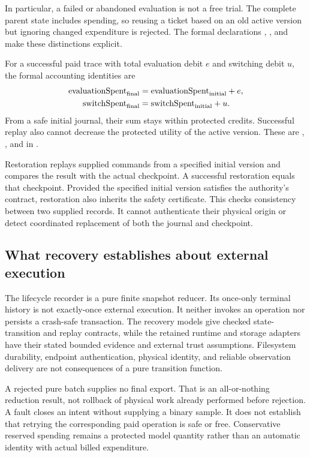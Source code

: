 In particular, a failed or abandoned evaluation is not a free trial. The
complete parent state includes spending, so reusing a ticket based on an old
active version but ignoring changed expenditure is rejected. The formal
declarations ,
, and
 make these distinctions explicit.

For a successful paid trace with total evaluation debit $e$ and switching debit
$u$, the formal accounting identities are
\begin{align}
 \mathrm{evaluationSpent}_{\rm final}
 &=\mathrm{evaluationSpent}_{\rm initial}+e,\\
 \mathrm{switchSpent}_{\rm final}
 &=\mathrm{switchSpent}_{\rm initial}+u.
\end{align}
From a safe initial journal, their sum stays within protected credits.
Successful replay also cannot decrease the protected utility of the active
version. These are ,
, and
 in
.

Restoration replays supplied commands from a specified initial version and
compares the result with the actual checkpoint. A successful restoration equals
that checkpoint. Provided the specified initial version satisfies the
authority's contract, restoration also inherits the safety certificate. This checks consistency
between two supplied records. It cannot authenticate their physical origin or
detect coordinated replacement of both the journal and checkpoint.

\subsection{What recovery establishes about external execution}

The lifecycle recorder is a pure finite snapshot reducer. Its once-only
terminal history is not exactly-once external execution. It neither invokes
an operation nor persists a crash-safe transaction. The recovery models give
checked state-transition and replay contracts, while the retained runtime and
storage adapters have their stated bounded evidence and external trust
assumptions. Filesystem durability, endpoint authentication, physical identity,
and reliable observation delivery are not consequences of a pure transition
function.

A rejected pure batch supplies no final export. That is an all-or-nothing
reduction result, not rollback of physical work already performed before
rejection. A fault closes an intent without supplying a binary sample. It does
not establish that retrying the corresponding paid operation is safe or free.
Conservative reserved spending remains a protected model quantity rather than
an automatic identity with actual billed expenditure.

